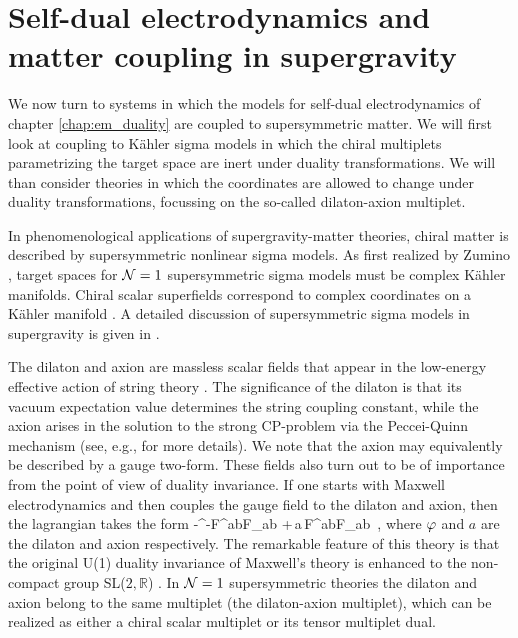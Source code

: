 \chapter{Self-dual electrodynamics and matter coupling in supergravity} 
\label{chap:matter_coupling}


We now turn to systems in which the models for self-dual electrodynamics of chapter \ref{chap:em_duality} are coupled to supersymmetric matter. We will first look at coupling to K{\"a}hler sigma models in which the chiral multiplets parametrizing the target space are inert under duality transformations. We will than consider theories in which the coordinates are allowed to change under duality transformations, focussing on the so-called dilaton-axion multiplet.

In phenomenological applications of supergravity-matter theories, chiral matter is described by supersymmetric nonlinear sigma models. As first realized by Zumino \cite{Zumino:1979et}, target spaces for ${\cal N}=1$ supersymmetric sigma models must be complex K{\"a}hler manifolds. Chiral scalar superfields correspond to complex coordinates on a K{\"a}hler manifold \cite{Alvarez-Gaume:1983ab,Bagger:1982fn,Bagger:1984ge,Bagger:1987xg}. A detailed discussion of supersymmetric sigma models in supergravity is given in \cite{Bagger:1990qh}.

The dilaton and axion are massless scalar fields that appear in the low-energy effective action of string theory \cite{Green:1987sp,Green:1987mn,Polchinski:1998rq,Polchinski:1998rr}. The significance of the dilaton is that its vacuum expectation value determines the string coupling constant, while the axion arises in the solution to the strong CP-problem via the Peccei-Quinn mechanism (see, e.g., \cite{Mohapatra:1986uf} for more details). We note that the axion may equivalently be described by a gauge two-form. These fields also turn out to be of importance from the point of view of duality invariance. If one starts with Maxwell electrodynamics and then couples the gauge field to the dilaton and axion, then the lagrangian takes the form
\bea
-^{-\vf}F^{ab}F_{ab}
+\,a\,F^{ab}{\tilde F}_{ab}~,
\eea
where $\varphi$ and $a$ are the dilaton and axion respectively. The remarkable feature of this theory is that the original U(1) duality invariance of Maxwell's theory is enhanced to the non-compact group SL($2,{\mathbb R}$) \cite{Gaillard:1981rj}. In ${\cal N}=1$ supersymmetric theories the dilaton and axion belong to the same multiplet (the dilaton-axion multiplet), which can be realized as either a chiral scalar multiplet or its tensor multiplet dual.

